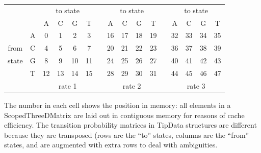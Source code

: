 \resizebox{5.5in}{!} {
\begin{tabular}{cccccccccccccccc}
      &    & \multicolumn{4}{c}{to state} & & \multicolumn{4}{c}{to state} & & \multicolumn{4}{c}{to state}	\\
      &    & A  & C  & G  &  T & & A  & C  & G  &  T & & A  & C  & G  &  T \\  \cline{3-6} \cline{8-11} \cline{13-16}
      &  A & \multicolumn{1}{|c}{0} & 1  & 2  &  \multicolumn{1}{c|}{3} & & \multicolumn{1}{|c}{16} & 17 & 18 & \multicolumn{1}{c|}{19} & & \multicolumn{1}{|c}{32} & 33 & 34 & \multicolumn{1}{c|}{35} \\
from  &  C & \multicolumn{1}{|c}{4} & 5  & 6  &  \multicolumn{1}{c|}{7} & & \multicolumn{1}{|c}{20} & 21 & 22 & \multicolumn{1}{c|}{23} & & \multicolumn{1}{|c}{36} & 37 & 38 & \multicolumn{1}{c|}{39} \\
state &  G & \multicolumn{1}{|c}{8} & 9  & 10 &  \multicolumn{1}{c|}{11} & & \multicolumn{1}{|c}{24} & 25 & 26 & \multicolumn{1}{c|}{27} & & \multicolumn{1}{|c}{40} & 41 & 42 & \multicolumn{1}{c|}{43} \\
      &  T & \multicolumn{1}{|c}{12} & 13 & 14 & \multicolumn{1}{c|}{15} & & \multicolumn{1}{|c}{28} & 29 & 30 & \multicolumn{1}{c|}{31} & & \multicolumn{1}{|c}{44} & 45 & 46 & \multicolumn{1}{c|}{47} \\ \cline{3-6} \cline{8-11} \cline{13-16}
      &    & \multicolumn{4}{c}{rate 1} & & \multicolumn{4}{c}{rate 2} & & \multicolumn{4}{c}{rate 3}	\\
\end{tabular}
}

The number in each cell shows the position in memory: all elements in a ScopedThreeDMatrix are laid out in contiguous memory for reasons of cache efficiency. The transition probability matrices in TipData structures are different because they are transposed (rows are the ``to'' states, columns are the ``from'' states, and are augmented with extra rows to deal with ambiguities.



